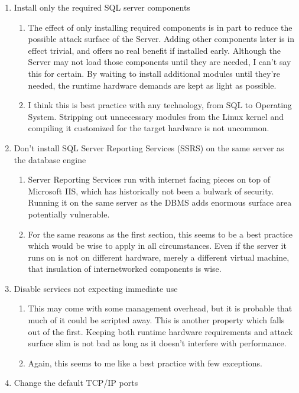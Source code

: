 \begin{enumerate}
\def\labelenumi{\arabic{enumi}.}
\item
  Install only the required SQL server components

  \begin{enumerate}
  \def\labelenumii{\arabic{enumii}.}
  \item
    The effect of only installing required components is in part to
    reduce the possible attack surface of the Server. Adding other
    components later is in effect trivial, and offers no real benefit if
    installed early. Although the Server may not load those components
    until they are needed, I can't say this for certain. By waiting to
    install additional modules until they're needed, the runtime
    hardware demands are kept as light as possible.
  \item
    I think this is best practice with any technology, from SQL to
    Operating System. Stripping out unnecessary modules from the Linux
    kernel and compiling it customized for the target hardware is not
    uncommon.
  \end{enumerate}
\item
  Don't install SQL Server Reporting Services (SSRS) on the same server
  as the database engine

  \begin{enumerate}
  \def\labelenumii{\arabic{enumii}.}
  \item
    Server Reporting Services run with internet facing pieces on top of
    Microsoft IIS, which has historically not been a bulwark of
    security. Running it on the same server as the DBMS adds enormous
    surface area potentially vulnerable.
  \item
    For the same reasons as the first section, this seems to be a best
    practice which would be wise to apply in all circumstances. Even if
    the server it runs on is not on different hardware, merely a
    different virtual machine, that insulation of internetworked
    components is wise.
  \end{enumerate}
\item
  Disable services not expecting immediate use

  \begin{enumerate}
  \def\labelenumii{\arabic{enumii}.}
  \item
    This may come with some management overhead, but it is probable that
    much of it could be scripted away. This is another property which
    falls out of the first. Keeping both runtime hardware requirements
    and attack surface slim is not bad as long as it doesn't interfere
    with performance.
  \item
    Again, this seems to me like a best practice with few exceptions.
  \end{enumerate}
\item
  Change the default TCP/IP ports


\end{enumerate}
